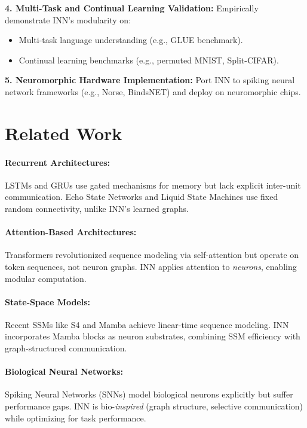 \documentclass{article}
\begin{document}
\textbf{4. Multi-Task and Continual Learning Validation:}
Empirically demonstrate INN's modularity on:
\begin{itemize}
    \item Multi-task language understanding (e.g., GLUE benchmark).
    \item Continual learning benchmarks (e.g., permuted MNIST, Split-CIFAR).
\end{itemize}

\textbf{5. Neuromorphic Hardware Implementation:}
Port INN to spiking neural network frameworks (e.g., Norse, BindsNET) and deploy on neuromorphic chips.

\section{Related Work}

\paragraph{Recurrent Architectures:}
LSTMs \cite{hochreiter1997long} and GRUs \cite{cho2014learning} use gated mechanisms for memory but lack explicit inter-unit communication. Echo State Networks \cite{jaeger2001echo} and Liquid State Machines \cite{maass2002real} use fixed random connectivity, unlike INN's learned graphs.

\paragraph{Attention-Based Architectures:}
Transformers \cite{vaswani2017attention} revolutionized sequence modeling via self-attention but operate on token sequences, not neuron graphs. INN applies attention to \emph{neurons}, enabling modular computation.

\paragraph{State-Space Models:}
Recent SSMs like S4 \cite{gu2021efficiently} and Mamba \cite{gu2023mamba} achieve linear-time sequence modeling. INN incorporates Mamba blocks as neuron substrates, combining SSM efficiency with graph-structured communication.

\paragraph{Biological Neural Networks:}
Spiking Neural Networks (SNNs) \cite{maass1997networks} model biological neurons explicitly but suffer performance gaps. INN is bio-\emph{inspired} (graph structure, selective communication) while optimizing for task performance.
\end{document}
